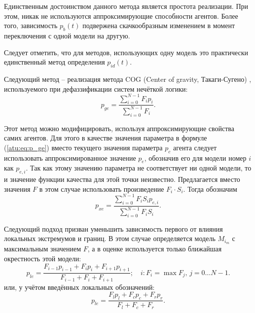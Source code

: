Единственным достоинством данного метода является простота реализации.
При этом, никак не используются аппроксимирующие способности агентов.
Более того, зависимость $p_{b}(t)$ подвержена
скачкообразным изменением в момент переключения
с одной модели на другую.

Следует отметить, что для методов, использующих
одну модель это практически единственный метод определения $p_{id}(t)$.


Следующий метод -- реализация
метода COG (Center of gravity, Такаги-Сугено) \cite{atu_asau25,atu_csit2015},
используемого при дефаззификации систем нечёткой логики:
%
\begin{equation}
  p_{ge}
  =
  \frac{\sum\limits_{i=0}^{N-1} F_{i} p_{i}}
       {\sum\limits_{i=0}^{N-1} F_{i} }
  .
  \label{atu:eq:p_ge}
\end{equation}

Этот метод можно модифицировать, используя аппроксимирующие свойства самих агентов.
Для этого в качестве значения параметра в формуле (\ref{atu:eq:p_ge})
вместо текущего значения параметра $p_c$ агента следует использовать
аппроксимированное значение $p_e$, обозначив его для
модели номер $i$ как $p_{e,i}$. Так как этому значению
параметра не соответствует ни одной модели, то и значение функции
качества для этой точки неизвестно. Предлагается вместо
значения $F$ в этом случае использовать произведение
$F_i \cdot S_i$. Тогда обозначим
%
\begin{equation}
  p_{xe}
  =
  \frac{\sum\limits_{i=0}^{N-1} F_{i} S_i p_{e,i}}
       {\sum\limits_{i=0}^{N-1} F_{i} S_i }
  .
  \label{atu:eq:p_xe}
\end{equation}

Следующий подход призван уменьшить зависимость первого
от влияния локальных экстремумов и границ. В этом
случае определяется модель $M_{i_{m}}$ с максимальным значением
$F$, а в оценке используется только ближайшая окрестность этой модели:
%
\begin{equation}
  p_{le}
  =
  \frac{ F_{i-1} p_{i-1} + F_{i} p_{i} + F_{i+1} p_{i+1} }
       { F_{i-1}         + F_{i}       + F_{i+1}         }
  ;
  \quad
  i : F_i = \max{F_j}, \, j=0 \ldots N-1 .
  \label{atu:eq:p_le}
\end{equation}
%
или, у учётом введённых локальных обозначений:
%
\begin{equation}
  p_{le}
  =
  \frac{ F_{l} p_{l} + F_{c} p_{c} + F_{r} p_{r} }
       { F_{l}       + F_{c}       + F_{r}       }
  .
  \label{atu:eq:p_lel}
\end{equation}

